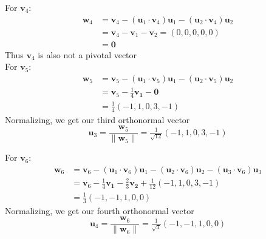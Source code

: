 \documentclass[12pt]{article}
\begin{document}
\begin{enumerate}
\begin{enumerate}
                    For \(\mathbf{v}_4\):
                    \begin{align*}
                        \mathbf{w}_4 & = \mathbf{v}_4- (\mathbf{u}_1\cdot\mathbf{v}_4)\mathbf{u}_1-(\mathbf{u}_2\cdot\mathbf{v}_4)\mathbf{u}_2 \\
                                     & = \mathbf{v}_4-\mathbf{v}_1-\mathbf{v}_2= (0,0,0,0,0)                                                   \\
                                     & = \mathbf{0}
                    \end{align*}
                    Thus \(\mathbf{v}_4\) is also not a pivotal vector \\

                    For \(\mathbf{v}_5\):
                    \begin{align*}
                        \mathbf{w}_5 & =\mathbf{v}_5-(\mathbf{u}_1\cdot\mathbf{v}_5)\mathbf{u}_1-(\mathbf{u}_2\cdot\mathbf{v}_5)\mathbf{u}_2 \\
                                     & =\mathbf{v}_5-\tfrac{1}{4}\mathbf{v_1}-\mathbf{0}                                                     \\
                                     & =\tfrac{1}{4} (-1,1,0,3,-1)
                    \end{align*}
                    Normalizing, we get our third orthonormal vector
                    \[
                        \mathbf{u}_3=\frac{\mathbf{w}_5}{\|\mathbf{w}_5\|}
                        =\tfrac{1}{\sqrt{12}}(-1,1,0,3,-1)
                    \]

                    For \(\mathbf{v}_6\):
                    \begin{align*}
                        \mathbf{w}_6 & =\mathbf{v}_6-(\mathbf{u}_1\cdot\mathbf{v}_6)\mathbf{u}_1-(\mathbf{u}_2\cdot\mathbf{v}_6)\mathbf{u}_2-(\mathbf{u}_3\cdot\mathbf{v}_6)\mathbf{u}_3 \\
                                     & =\mathbf{v}_6-\tfrac{1}{4}\mathbf{v_1}-\tfrac{2}{3}\mathbf{v_2}+\tfrac{1}{12} (-1,1,0,3,-1)                                                       \\
                                     & =\tfrac{1}{3} (-1,-1,1,0,0)
                    \end{align*}
                    Normalizing, we get our fourth orthonormal vector
                    \[
                        \mathbf{u}_4=\frac{\mathbf{w}_6}{\|\mathbf{w}_6\|} =\tfrac{1}{\sqrt{3}}(-1,-1,1,0,0)
                    \]


\end{enumerate}
\end{enumerate}
\end{document}
